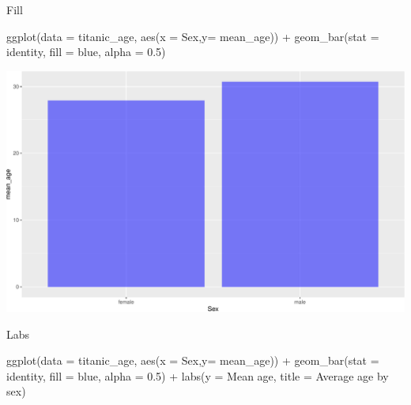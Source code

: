 \documentclass[
]{book}
\newenvironment{Shaded}{\begin{snugshade}}{\end{snugshade}}
\newcommand{\AttributeTok}[1]{\textcolor[rgb]{0.77,0.63,0.00}{#1}}
\newcommand{\FloatTok}[1]{\textcolor[rgb]{0.00,0.00,0.81}{#1}}
\newcommand{\FunctionTok}[1]{\textcolor[rgb]{0.00,0.00,0.00}{#1}}
\newcommand{\NormalTok}[1]{#1}
\newcommand{\SpecialCharTok}[1]{\textcolor[rgb]{0.00,0.00,0.00}{#1}}
\newcommand{\StringTok}[1]{\textcolor[rgb]{0.31,0.60,0.02}{#1}}
\begin{document}
Fill

\begin{Shaded}
\begin{Highlighting}[]
\FunctionTok{ggplot}\NormalTok{(}\AttributeTok{data =}\NormalTok{ titanic\_age, }\FunctionTok{aes}\NormalTok{(}\AttributeTok{x =}\NormalTok{ Sex,}\AttributeTok{y=}\NormalTok{ mean\_age)) }\SpecialCharTok{+} \FunctionTok{geom\_bar}\NormalTok{(}\AttributeTok{stat =} \StringTok{\textquotesingle{}identity\textquotesingle{}}\NormalTok{, }\AttributeTok{fill =} \StringTok{\textquotesingle{}blue\textquotesingle{}}\NormalTok{, }\AttributeTok{alpha =} \FloatTok{0.5}\NormalTok{) }
\end{Highlighting}
\end{Shaded}

\includegraphics{figures/unnamed-chunk-143-1.pdf}

Labs

\begin{Shaded}
\begin{Highlighting}[]

\FunctionTok{ggplot}\NormalTok{(}\AttributeTok{data =}\NormalTok{ titanic\_age, }\FunctionTok{aes}\NormalTok{(}\AttributeTok{x =}\NormalTok{ Sex,}\AttributeTok{y=}\NormalTok{ mean\_age)) }\SpecialCharTok{+} \FunctionTok{geom\_bar}\NormalTok{(}\AttributeTok{stat =} \StringTok{\textquotesingle{}identity\textquotesingle{}}\NormalTok{, }\AttributeTok{fill =} \StringTok{\textquotesingle{}blue\textquotesingle{}}\NormalTok{, }\AttributeTok{alpha =} \FloatTok{0.5}\NormalTok{) }\SpecialCharTok{+} \FunctionTok{labs}\NormalTok{(}\AttributeTok{y =} \StringTok{\textquotesingle{}Mean age\textquotesingle{}}\NormalTok{, }\AttributeTok{title =} \StringTok{\textquotesingle{}Average age by sex\textquotesingle{}}\NormalTok{)}
\end{Highlighting}
\end{Shaded}
\end{document}
